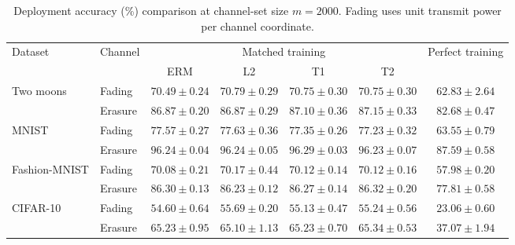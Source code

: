 \begin{table}[t]
\centering
\caption{Deployment accuracy (\%) comparison at channel-set size $m=2000$. Fading uses unit transmit power per channel coordinate.}
\label{tab:performance}
\begin{tabular*}{\linewidth}{@{\extracolsep{\fill}}llccccc@{}}
\toprule
\multirow{2}{*}{Dataset} & \multirow{2}{*}{Channel}
& \multicolumn{4}{c}{Matched training} & \multirow{2}{*}{Perfect training} \\
\cmidrule(lr){3-6}
& & ERM & L2 & T1 & T2 &  \\
\midrule
\multirow{2}{*}{Two moons}
& Fading
& $70.49\pm0.24$ & $\mathbf{70.79}\pm0.29$ & $70.75\pm0.30$ & $70.75\pm0.30$ & $62.83\pm2.64$ \\
& Erasure
& $86.87\pm0.20$ & $86.87\pm0.29$ & $87.10\pm0.36$ & $\mathbf{87.15}\pm0.33$ & $82.68\pm0.47$ \\
\midrule
\multirow{2}{*}{MNIST}
& Fading
& $77.57\pm0.27$ & $\mathbf{77.63}\pm0.36$ & $77.35\pm0.26$ & $77.23\pm0.32$ & $63.55\pm0.79$ \\
& Erasure
& $96.24\pm0.04$ & $96.24\pm0.05$ & $\mathbf{96.29}\pm0.03$ & $96.23\pm0.07$ & $87.59\pm0.58$ \\
\midrule
\multirow{2}{*}{Fashion-MNIST}
& Fading
& $70.08\pm0.21$ & $\mathbf{70.17}\pm0.44$ & $70.12\pm0.14$ & $70.12\pm0.16$ & $57.98\pm0.20$ \\
& Erasure
& $86.30\pm0.13$ & $86.23\pm0.12$ & $86.27\pm0.14$ & $\mathbf{86.32}\pm0.20$ & $77.81\pm0.58$ \\
\midrule
\multirow{2}{*}{CIFAR-10}
& Fading
& $54.60\pm0.64$ & $\mathbf{55.69}\pm0.20$ & $55.13\pm0.47$ & $55.24\pm0.56$ & $23.06\pm0.60$ \\
& Erasure
& $65.23\pm0.95$ & $65.10\pm1.13$ & $65.23\pm0.70$ & $\mathbf{65.34}\pm0.53$ & $37.07\pm1.94$ \\
\bottomrule
\end{tabular*}
\end{table}
